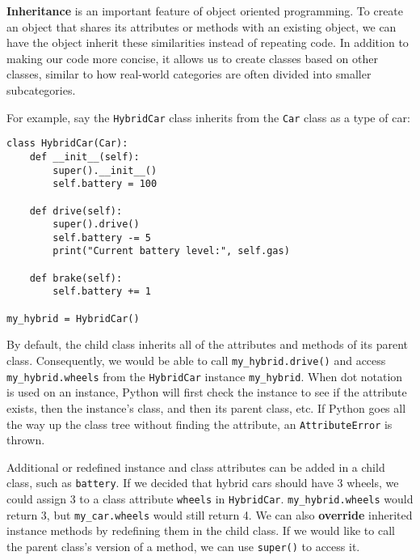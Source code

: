 \textbf{Inheritance} is an important feature of object oriented programming. To create an object that shares its attributes or methods with an existing object, we can have the object inherit these similarities instead of repeating code. In addition to making our code more concise, it allows us to create classes based on other classes, similar to how real-world categories are often divided into smaller subcategories. 

For example, say the \lstinline{HybridCar} class inherits from the \lstinline{Car} class as a type of car: 

\begin{lstlisting}
class HybridCar(Car):
    def __init__(self):
        super().__init__()
        self.battery = 100

    def drive(self):
        super().drive()
        self.battery -= 5
        print("Current battery level:", self.gas)

    def brake(self):
        self.battery += 1

my_hybrid = HybridCar()
\end{lstlisting}

By default, the child class inherits all of the attributes and methods of its parent class. Consequently, we would be able to call \lstinline{my_hybrid.drive()} and access \lstinline{my_hybrid.wheels} from the \lstinline{HybridCar} instance \lstinline{my_hybrid}. When dot notation is used on an instance, Python will first check the instance to see if the attribute exists, then the instance's class, and then its parent class, etc. If Python goes all the way up the class tree without finding the attribute, an \lstinline{AttributeError} is thrown. 

Additional or redefined instance and class attributes can be added in a child class, such as \lstinline{battery}. If we decided that hybrid cars should have 3 wheels, we could assign 3 to a class attribute \lstinline{wheels} in \lstinline{HybridCar}. \lstinline{my_hybrid.wheels} would return 3, but \lstinline{my_car.wheels} would still return 4. We can also \textbf{override} inherited instance methods by redefining them in the child class. If we would like to call the parent class's version of a method, we can use \lstinline{super()} to access it.

